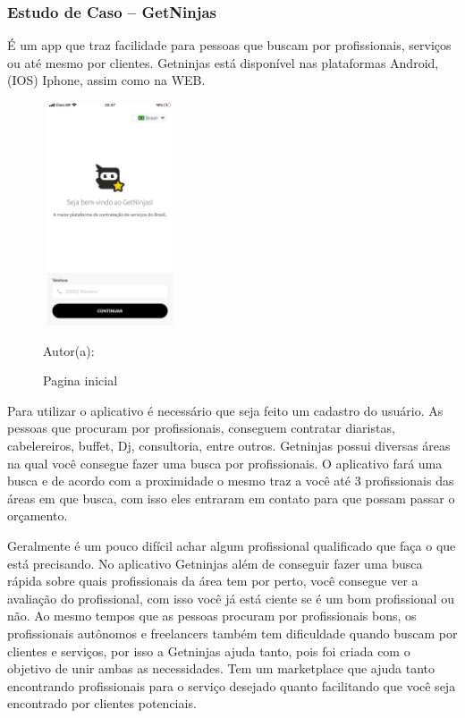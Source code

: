 \newpage
\subsubsection{Estudo de Caso – GetNinjas}

É um app que traz facilidade para pessoas que buscam por profissionais, serviços ou até mesmo por clientes. Getninjas está disponível nas plataformas Android, (IOS) Iphone, assim como na WEB.

\begin{figure}[!h]
	\centering
	\caption{Pagina inicial}
	\includegraphics[width=150px, height=250px]{./images/getNinjasMobile2.jpeg}
	\par {Autor(a): \cite{get-ninjasMobilea}}
\end{figure}

Para utilizar o aplicativo é necessário que seja feito um cadastro do usuário. As pessoas que procuram por profissionais, conseguem contratar diaristas, cabelereiros, buffet, Dj, consultoria, entre outros. Getninjas possui diversas áreas na qual você consegue fazer uma busca por profissionais. O aplicativo fará uma busca e de acordo com a proximidade o mesmo traz a você até 3 profissionais das áreas em que busca, com isso eles entraram em contato para que possam passar o orçamento.

Geralmente é um pouco difícil achar algum profissional qualificado que faça o que está precisando. No aplicativo Getninjas além de conseguir fazer uma busca rápida sobre quais profissionais da área tem por perto, você consegue ver a avaliação do profissional, com isso você já está ciente se é um bom profissional ou não. Ao mesmo tempos que as pessoas procuram por profissionais bons, os profissionais autônomos e freelancers também tem dificuldade quando buscam por clientes e serviços, por isso a Getninjas ajuda tanto, pois foi criada com o objetivo de unir ambas as necessidades. Tem um marketplace que ajuda tanto encontrando profissionais para o serviço desejado quanto facilitando que você seja encontrado por clientes potenciais.

